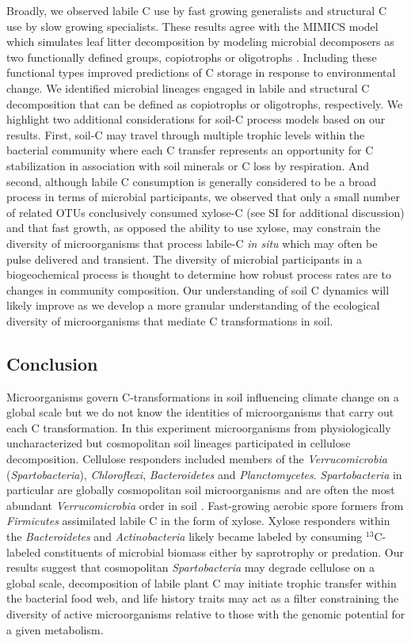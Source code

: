 Broadly, we observed labile C use by fast growing generalists and structural
C use by slow growing specialists. These results agree with the MIMICS model
which simulates leaf litter decomposition by modeling microbial decomposers
as two functionally defined groups, copiotrophs or oligotrophs
\citep{wieder_2014a}. Including these functional types improved predictions
of C storage in response to environmental change. We identified
microbial lineages engaged in labile and structural C decomposition that
can be defined as copiotrophs or oligotrophs, respectively. We highlight two
additional considerations for soil-C process models based on our results.
First, soil-C may travel through multiple trophic levels within the bacterial
community where each C transfer represents an opportunity for C stabilization
in association with soil minerals or C loss by respiration. And second,
although labile C consumption is generally considered to be a broad process in
terms of microbial participants, we observed that only a small number of
related OTUs conclusively consumed xylose-C (see SI for additional discussion) and
that fast growth, as opposed the ability to use xylose, may constrain the diversity
of microorganisms that process labile-C \textit{in situ} which may often be
pulse delivered and transient. The diversity of microbial participants in a
biogeochemical process is thought to determine how robust process rates are to
changes in community composition. Our understanding of soil C dynamics will
likely improve as we develop a more granular understanding of the ecological
diversity of microorganisms that mediate C transformations in soil.

\subsection{Conclusion} 
Microorganisms govern C-transformations in soil influencing climate change on
a global scale but we do not know the identities of microorganisms that carry
out each C transformation. In this experiment microorganisms from physiologically
uncharacterized but cosmopolitan soil lineages participated in cellulose
decomposition. Cellulose responders included members of the
\textit{Verrucomicrobia} (\textit{Spartobacteria}), \textit{Chloroflexi},
\textit{Bacteroidetes} and \textit{Planctomycetes}. \textit{Spartobacteria} in
particular are globally cosmopolitan soil microorganisms and are often the most
abundant \textit{Verrucomicrobia} order in soil \citep{Bergmann_2011}.
Fast-growing aerobic spore formers from \textit{Firmicutes} assimilated labile
C in the form of xylose. Xylose responders within the \textit{Bacteroidetes}
and \textit{Actinobacteria} likely became labeled by consuming $^{13}$C-labeled
constituents of microbial biomass either by saprotrophy or predation. Our
results suggest that cosmopolitan \textit{Spartobacteria} may degrade cellulose
on a global scale, decomposition of labile plant C may initiate trophic transfer 
within the bacterial food web, and life history traits may act
as a filter constraining the diversity of active microorganisms relative to
those with the genomic potential for a given metabolism.

